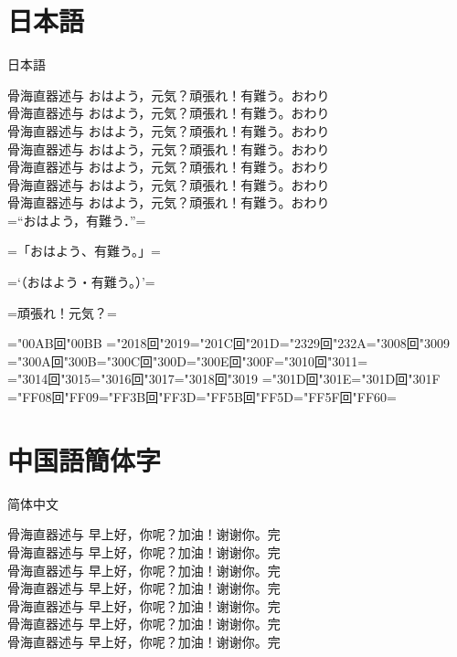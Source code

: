 \documentclass[landscape]{utarticle}
\begin{document}
\parindent0mm

\section{日本語}
\upjpngtb 日本語

\upjpnrml 骨海直器述与 おはよう，元気？頑張れ！有難う。おわり\\
\upjpnrmm 骨海直器述与 おはよう，元気？頑張れ！有難う。おわり\\
\upjpnrmb 骨海直器述与 おはよう，元気？頑張れ！有難う。おわり\\
\upjpngtm 骨海直器述与 おはよう，元気？頑張れ！有難う。おわり\\
\upjpngtb 骨海直器述与 おはよう，元気？頑張れ！有難う。おわり\\
\upjpngte 骨海直器述与 おはよう，元気？頑張れ！有難う。おわり\\
\upjpngth 骨海直器述与 おはよう，元気？頑張れ！有難う。おわり\\

\upjpnrmm
=“おはよう，有難う．”=

=「おはよう、有難う。」=

=‘（おはよう・有難う。）’=

=頑張れ！元気？=

=\kchar"00AB回\kchar"00BB%
=\kchar"2018回\kchar"2019=\kchar"201C回\kchar"201D=\kchar"2329回\kchar"232A=\kchar"3008回\kchar"3009%
=\kchar"300A回\kchar"300B=\kchar"300C回\kchar"300D=\kchar"300E回\kchar"300F=\kchar"3010回\kchar"3011=\\
=\kchar"3014回\kchar"3015=\kchar"3016回\kchar"3017=\kchar"3018回\kchar"3019%
=\kchar"301D回\kchar"301E=\kchar"301D回\kchar"301F%
=\kchar"FF08回\kchar"FF09=\kchar"FF3B回\kchar"FF3D=\kchar"FF5B回\kchar"FF5D=\kchar"FF5F回\kchar"FF60=


\section{中国語簡体字}
\upschgtb 简体中文

\upschrml 骨海直器述与 早上好，你呢？加油！谢谢你。完\\
\upschrmm 骨海直器述与 早上好，你呢？加油！谢谢你。完\\
\upschrmb 骨海直器述与 早上好，你呢？加油！谢谢你。完\\
\upschgtm 骨海直器述与 早上好，你呢？加油！谢谢你。完\\
\upschgtb 骨海直器述与 早上好，你呢？加油！谢谢你。完\\
\upschgte 骨海直器述与 早上好，你呢？加油！谢谢你。完\\
\upschgth 骨海直器述与 早上好，你呢？加油！谢谢你。完\\
\end{document}
